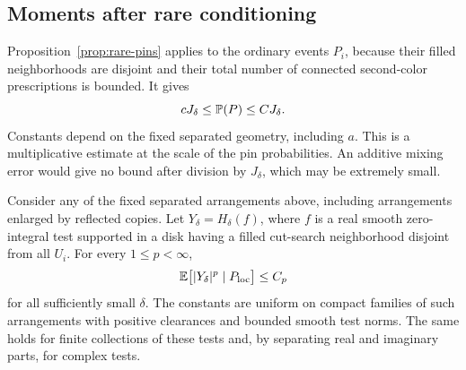 \subsection{Moments after rare conditioning}

Proposition~\ref{prop:rare-pins} applies to the ordinary events $P_i$,
because their filled neighborhoods are disjoint and their total number
of connected second-color prescriptions is bounded.  It gives
\begin{equation}\label{pins:multiplicative}
 c J_\delta\le\mathbb P(P)\le C J_\delta.
\end{equation}
Constants depend on the fixed separated geometry, including $a$.
This is a multiplicative estimate at the scale of the pin probabilities.
An additive mixing error would give no bound after division by
$J_\delta$, which may be extremely small.

\begin{proposition}\label{prop:pin-moments}
Consider any of the fixed separated arrangements above, including
arrangements enlarged by reflected copies.  Let $Y_\delta=H_\delta(f)$,
where $f$ is a real smooth zero-integral test supported in a disk having a
filled cut-search neighborhood disjoint from all $U_i$.  For every
$1\le p<\infty$,
\begin{equation}\label{eq:pin-moments}
 \mathbb E\bigl[|Y_\delta|^p\mid P_{\mathrm{loc}}\bigr]\le C_p
\end{equation}
for all sufficiently small $\delta$.  The constants are uniform on
compact families of such arrangements with positive clearances and
bounded smooth test norms.  The same holds for finite collections of
these tests and, by separating real and imaginary parts, for complex
tests.
\end{proposition}


